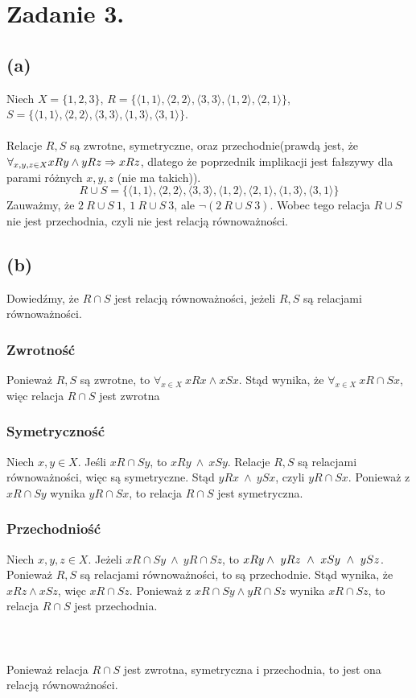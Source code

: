 \documentclass{article}
\begin{document}
\section*{Zadanie 3.}
\subsection*{(a)}
Niech $X = \{1,2,3\}$, $R=\{\langle 1,1 \rangle,\langle 2,2 \rangle,\langle 3,3 \rangle,\langle 1,2 \rangle,\langle 2,1\rangle\}$, $S=\{\langle 1,1 \rangle,\langle 2,2 \rangle,\langle 3,3 \rangle,\langle 1,3 \rangle,\langle 3,1\rangle\}$.
\\\\ Relacje $R,S$ są zwrotne, symetryczne, oraz przechodnie(prawdą jest, że $\forall_{x,y,z \in X} xRy \wedge yRz \Rightarrow xRz$, dlatego że poprzednik implikacji jest fałszywy dla parami różnych $x,y,z$ (nie ma takich)).
 \[R \cup S = \{\langle 1,1 \rangle,\langle 2,2 \rangle,\langle 3,3 \rangle,\langle 1,2 \rangle,\langle 2,1\rangle,\langle 1,3 \rangle,\langle 3,1\rangle\} \]
 Zauważmy, że $2 \ R \cup S \ 1, \  1 \ R \cup S \ 3 $, ale $\lnot (2 \ R \cup S \ 3)$. Wobec tego relacja $R \cup S$ nie jest przechodnia, czyli nie jest relacją równoważności.

\subsection*{(b)}
Dowiedźmy, że $R\cap S$ jest relacją równoważności, jeżeli $R,S$ są relacjami równoważności.
\subsubsection*{Zwrotność}
Ponieważ $R,S$ są zwrotne, to $\forall_{x \in X} \ xRx \wedge xSx$. Stąd wynika, że $\forall_{x\in X} \  x R\cap S x$, więc relacja $R\cap S$ jest zwrotna
\subsubsection*{Symetryczność}
Niech $x,y \in X$. Jeśli $x R\cap S y$, to $xRy \ \wedge \ xSy$. Relacje $R,S$ są relacjami równoważności, więc są symetryczne. Stąd $yRx \ \wedge \ ySx$, czyli $y R\cap S x$. Ponieważ z $x R\cap S y$ wynika $y R\cap S x$, to relacja $R \cap S$ jest symetryczna.
\subsubsection*{Przechodniość}
Niech $x,y,z \in X$. Jeżeli $x R\cap S y \  \wedge \ y R\cap S z$, to $xRy\wedge \ yRz \ \wegde \ xSy \ \wedge \ ySz$. Ponieważ $R,S$ są relacjami równoważności, to są przechodnie. Stąd wynika, że $xRz \wedge xSz$, więc $x R\cap S z$. Ponieważ z $x R\cap S y \wedge y R\cap S z$ wynika $x R\cap S z$, to relacja $R \cap S$ jest przechodnia.
\\\\
\\\\
Ponieważ relacja $R \cap S$ jest zwrotna, symetryczna i przechodnia, to jest ona relacją równoważności. 
\end{document}
